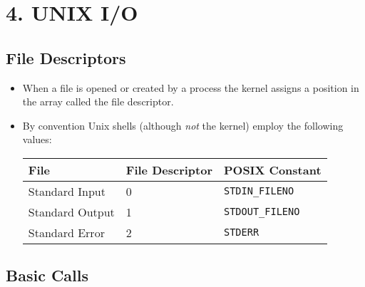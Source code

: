 \documentclass[]{article}
\begin{document}
\section{\texorpdfstring{\textbf{4. UNIX
I/O}}{4. UNIX I/O}}\label{header-n369}

\subsection{\texorpdfstring{\textbf{File
Descriptors}}{File Descriptors}}\label{header-n371}

\begin{itemize}
\item
  When a file is opened or created by a process the kernel assigns a
  position in the array called the file descriptor.
\item
  By convention Unix shells (although \emph{not} the kernel) employ the
  following values:

  \begin{longtable}[]{@{}lll@{}}
  \toprule
  File & File Descriptor & POSIX Constant\tabularnewline
  \midrule
  \endhead
  Standard Input & 0 & \texttt{STDIN\_FILENO}\tabularnewline
  Standard Output & 1 & \texttt{STDOUT\_FILENO}\tabularnewline
  Standard Error & 2 & \texttt{STDERR}\tabularnewline
  \bottomrule
  \end{longtable}
\end{itemize}

\subsection{\texorpdfstring{\textbf{Basic
Calls}}{Basic Calls}}\label{header-n395}
\end{document}
